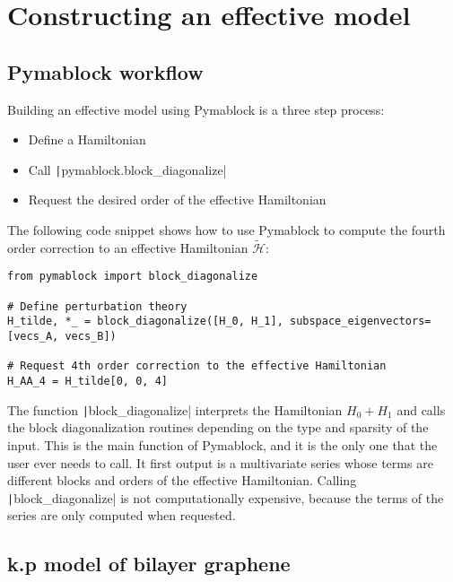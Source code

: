 \section{Constructing an effective model}
\subsection{Pymablock workflow}

Building an effective model using Pymablock is a three step process:
%
\begin{itemize}
\item Define a Hamiltonian
\item Call \texttt|pymablock.block_diagonalize|
\item Request the desired order of the effective Hamiltonian
\end{itemize}
%
The following code snippet shows how to use Pymablock to compute the fourth
order correction to an effective Hamiltonian $\tilde{\mathcal{H}}$:
%
\begin{verbatim}
from pymablock import block_diagonalize

# Define perturbation theory
H_tilde, *_ = block_diagonalize([H_0, H_1], subspace_eigenvectors=[vecs_A, vecs_B])

# Request 4th order correction to the effective Hamiltonian
H_AA_4 = H_tilde[0, 0, 4]
\end{verbatim}


The function \texttt|block_diagonalize| interprets the Hamiltonian $H_0 +
H_1$ and calls the block diagonalization routines depending on the
type and sparsity of the input.
This is the main function of Pymablock, and it is the only one that the user
ever needs to call.
It first output is a multivariate series whose terms are different blocks and
orders of the effective Hamiltonian.
Calling \texttt|block_diagonalize| is not computationally expensive, because the
terms of the series are only computed when requested.

\subsection{k.p model of bilayer graphene}

